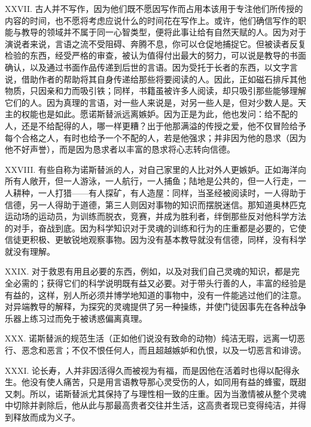 XXVII. 古人并不写作，因为他们既不愿因写作而占用本该用于专注他们所传授的内容的时间，也不愿将考虑应说什么的时间花在写作上。或许，他们确信写作的职能与教导的领域并不属于同一心智类型，便将此事让给有自然天赋的人。因为对于演说者来说，言语之流不受阻碍、奔腾不息，你可以仓促地捕捉它。但被读者反复检验的东西，经受严格的审查，被认为值得付出最大的努力，可以说是教导的书面确认，以及通过书面作品传递到后世的言语。因为受托于长者的东西，以文字言说，借助作者的帮助将其自身传递给那些将要阅读的人。因此，正如磁石排斥其他物质，只因亲和力而吸引铁；同样，书籍虽被许多人阅读，却只吸引那些能够理解它们的人。因为真理的言语，对一些人来说是，对另一些人是，但对少数人是。天主的权能也是如此。愿诺斯替派远离嫉妒。因为正是为此，他也发问：给不配的人，还是不给配得的人，哪一样更糟？出于他那满溢的传授之爱，他不仅冒险给予每个合格之人，有时也给予一个不配的人，若是他强求；并非因为他的恳求（因为他不好声誉），而是因为恳求者以丰富的恳求将心志转向信德。\par

XXVIII. 有些自称为诺斯替派的人，对自己家里的人比对外人更嫉妒。正如海洋向所有人敞开，但一人游泳，一人航行，一人捕鱼；陆地是公共的，但一人行走，一人耕种，一人打猎——有人探矿，有人造屋：同样，当圣经被阅读时，一人得助于信德，另一人得助于道德，第三人则因对事物的知识而摆脱迷信。那知道奥林匹克运动场的运动员，为训练而脱衣，竞赛，并成为胜利者，绊倒那些反对他科学方法的对手，奋战到底。因为科学知识对于灵魂的训练和行为的庄重都是必要的，它使信徒更积极、更敏锐地观察事物。因为没有基本教导就没有信德，同样，没有科学就没有理解。\par

XXIX. 对于救恩有用且必要的东西，例如，以及对我们自己灵魂的知识，都是完全必需的；获得它们的科学说明既有益又必要。对于带头行善的人，丰富的经验是有益的，这样，别人所必须并博学地知道的事物中，没有一件能逃过他们的注意。对异端教导的解释，为探究的灵魂提供了另一种操练，并使门徒因事先在各种战争乐器上练习过而免于被诱惑偏离真理。\par

XXX. 诺斯替派的规范生活（正如他们说没有致命的动物）纯洁无瑕，远离一切恶行、恶念和恶言；不仅不恨任何人，而且超越嫉妒和仇恨，以及一切恶言和诽谤。\par

XXXI. 论长寿，人并非因活得久而被视为有福，而是因他在活着时也得以配得永生。他没有使人痛苦，只是用言语教导那心灵受伤的人，如同用有益的蜂蜜，既甜又刺。所以，诺斯替派尤其保持了与理性相一致的庄重。因为当激情被从整个灵魂中切除并剥除后，他从此与那最高贵者交往并生活，这高贵者现已变得纯洁，并得到释放而成为义子。\par

